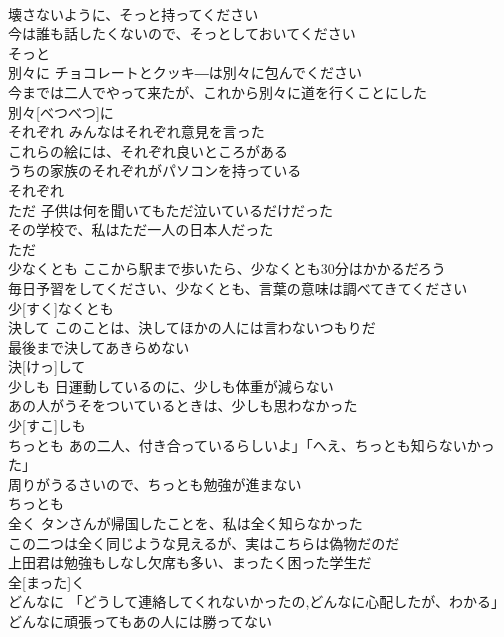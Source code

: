 \documentclass[8pt]{extreport}
\begin{document}
\begin{CJK}{UTF8}{min}
\\	壊さないように、そっと持ってください 
\\	今は誰も話したくないので、そっとしておいてください 
\\	そっと			
\\	別々に	チョコレートとクッキ―は別々に包んでください 
\\	今までは二人でやって来たが、これから別々に道を行くことにした 
\\	別々[べつべつ]に			
\\	それぞれ	みんなはそれぞれ意見を言った 
\\	これらの絵には、それぞれ良いところがある 
\\	うちの家族のそれぞれがパソコンを持っている 
\\	それぞれ			
\\	ただ	子供は何を聞いてもただ泣いているだけだった 
\\	その学校で、私はただ一人の日本人だった 
\\	ただ			
\\	少なくとも	ここから駅まで歩いたら、少なくとも30分はかかるだろう 
\\	毎日予習をしてください、少なくとも、言葉の意味は調べてきてください 
\\	少[すく]なくとも			
\\	決して	このことは、決してほかの人には言わないつもりだ 
\\	最後まで決してあきらめない 
\\	決[けっ]して			
\\	少しも	日運動しているのに、少しも体重が減らない 
\\	あの人がうそをついているときは、少しも思わなかった 
\\	少[すこ]しも			
\\	ちっとも	あの二人、付き合っているらしいよ」「へえ、ちっとも知らないかっ た」 
\\	周りがうるさいので、ちっとも勉強が進まない 
\\	ちっとも			
\\	全く	タンさんが帰国したことを、私は全く知らなかった 
\\	この二つは全く同じような見えるが、実はこちらは偽物だのだ 
\\	上田君は勉強もしなし欠席も多い、まったく困った学生だ 
\\	全[まった]く						
\\	どんなに	「どうして連絡してくれないかったの,どんなに心配したが、わかる」 
\\	どんなに頑張ってもあの人には勝ってない 

\end{CJK}
\end{document}

